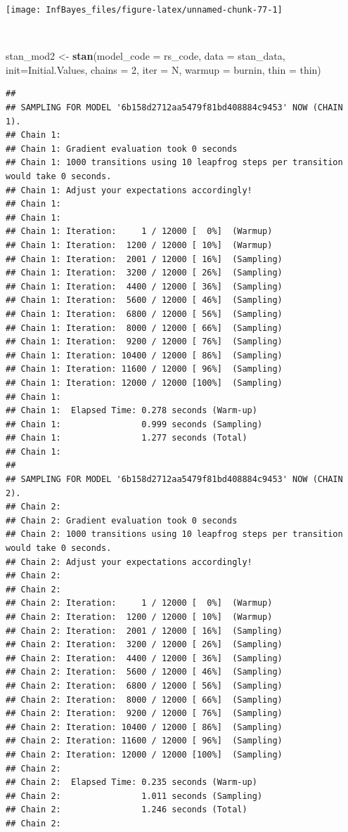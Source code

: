\documentclass[
]{book}
\newenvironment{Shaded}{\begin{snugshade}}{\end{snugshade}}
\newcommand{\DataTypeTok}[1]{\textcolor[rgb]{0.13,0.29,0.53}{#1}}
\newcommand{\DecValTok}[1]{\textcolor[rgb]{0.00,0.00,0.81}{#1}}
\newcommand{\KeywordTok}[1]{\textcolor[rgb]{0.13,0.29,0.53}{\textbf{#1}}}
\newcommand{\NormalTok}[1]{#1}
\newcommand{\StringTok}[1]{\textcolor[rgb]{0.31,0.60,0.02}{#1}}
\begin{document}
\begin{center}\texttt{[image: InfBayes\_files/figure-latex/unnamed-chunk-77-1]} \end{center}

\(~\)

\begin{Shaded}
\begin{Highlighting}[]
\NormalTok{stan_mod2 <-}\StringTok{ }\KeywordTok{stan}\NormalTok{(}\DataTypeTok{model_code =}\NormalTok{ rs_code, }\DataTypeTok{data =}\NormalTok{ stan_data, }\DataTypeTok{init=}\NormalTok{Initial.Values,}
            \DataTypeTok{chains =} \DecValTok{2}\NormalTok{, }\DataTypeTok{iter =}\NormalTok{ N, }\DataTypeTok{warmup =}\NormalTok{ burnin, }\DataTypeTok{thin =}\NormalTok{ thin)}
\end{Highlighting}
\end{Shaded}

\begin{verbatim}
## 
## SAMPLING FOR MODEL '6b158d2712aa5479f81bd408884c9453' NOW (CHAIN 1).
## Chain 1: 
## Chain 1: Gradient evaluation took 0 seconds
## Chain 1: 1000 transitions using 10 leapfrog steps per transition would take 0 seconds.
## Chain 1: Adjust your expectations accordingly!
## Chain 1: 
## Chain 1: 
## Chain 1: Iteration:     1 / 12000 [  0%]  (Warmup)
## Chain 1: Iteration:  1200 / 12000 [ 10%]  (Warmup)
## Chain 1: Iteration:  2001 / 12000 [ 16%]  (Sampling)
## Chain 1: Iteration:  3200 / 12000 [ 26%]  (Sampling)
## Chain 1: Iteration:  4400 / 12000 [ 36%]  (Sampling)
## Chain 1: Iteration:  5600 / 12000 [ 46%]  (Sampling)
## Chain 1: Iteration:  6800 / 12000 [ 56%]  (Sampling)
## Chain 1: Iteration:  8000 / 12000 [ 66%]  (Sampling)
## Chain 1: Iteration:  9200 / 12000 [ 76%]  (Sampling)
## Chain 1: Iteration: 10400 / 12000 [ 86%]  (Sampling)
## Chain 1: Iteration: 11600 / 12000 [ 96%]  (Sampling)
## Chain 1: Iteration: 12000 / 12000 [100%]  (Sampling)
## Chain 1: 
## Chain 1:  Elapsed Time: 0.278 seconds (Warm-up)
## Chain 1:                0.999 seconds (Sampling)
## Chain 1:                1.277 seconds (Total)
## Chain 1: 
## 
## SAMPLING FOR MODEL '6b158d2712aa5479f81bd408884c9453' NOW (CHAIN 2).
## Chain 2: 
## Chain 2: Gradient evaluation took 0 seconds
## Chain 2: 1000 transitions using 10 leapfrog steps per transition would take 0 seconds.
## Chain 2: Adjust your expectations accordingly!
## Chain 2: 
## Chain 2: 
## Chain 2: Iteration:     1 / 12000 [  0%]  (Warmup)
## Chain 2: Iteration:  1200 / 12000 [ 10%]  (Warmup)
## Chain 2: Iteration:  2001 / 12000 [ 16%]  (Sampling)
## Chain 2: Iteration:  3200 / 12000 [ 26%]  (Sampling)
## Chain 2: Iteration:  4400 / 12000 [ 36%]  (Sampling)
## Chain 2: Iteration:  5600 / 12000 [ 46%]  (Sampling)
## Chain 2: Iteration:  6800 / 12000 [ 56%]  (Sampling)
## Chain 2: Iteration:  8000 / 12000 [ 66%]  (Sampling)
## Chain 2: Iteration:  9200 / 12000 [ 76%]  (Sampling)
## Chain 2: Iteration: 10400 / 12000 [ 86%]  (Sampling)
## Chain 2: Iteration: 11600 / 12000 [ 96%]  (Sampling)
## Chain 2: Iteration: 12000 / 12000 [100%]  (Sampling)
## Chain 2: 
## Chain 2:  Elapsed Time: 0.235 seconds (Warm-up)
## Chain 2:                1.011 seconds (Sampling)
## Chain 2:                1.246 seconds (Total)
## Chain 2:
\end{verbatim}
\end{document}
